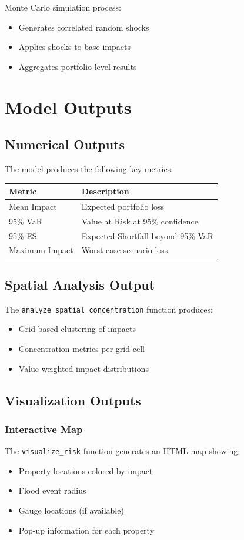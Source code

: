 \documentclass{article}
\begin{document}
Monte Carlo simulation process:
\begin{itemize}
    \item Generates correlated random shocks
    \item Applies shocks to base impacts
    \item Aggregates portfolio-level results
\end{itemize}

\section{Model Outputs}

\subsection{Numerical Outputs}
The model produces the following key metrics:

\begin{table}[h]
\begin{tabular}{ll}
\hline
\textbf{Metric} & \textbf{Description} \\
\hline
Mean Impact & Expected portfolio loss \\
95\% VaR & Value at Risk at 95\% confidence \\
95\% ES & Expected Shortfall beyond 95\% VaR \\
Maximum Impact & Worst-case scenario loss \\
\hline
\end{tabular}
\end{table}

\subsection{Spatial Analysis Output}
The \texttt{analyze\_spatial\_concentration} function produces:
\begin{itemize}
    \item Grid-based clustering of impacts
    \item Concentration metrics per grid cell
    \item Value-weighted impact distributions
\end{itemize}

\subsection{Visualization Outputs}

\subsubsection{Interactive Map}
The \texttt{visualize\_risk} function generates an HTML map showing:
\begin{itemize}
    \item Property locations colored by impact
    \item Flood event radius
    \item Gauge locations (if available)
    \item Pop-up information for each property
\end{itemize}
\end{document}
